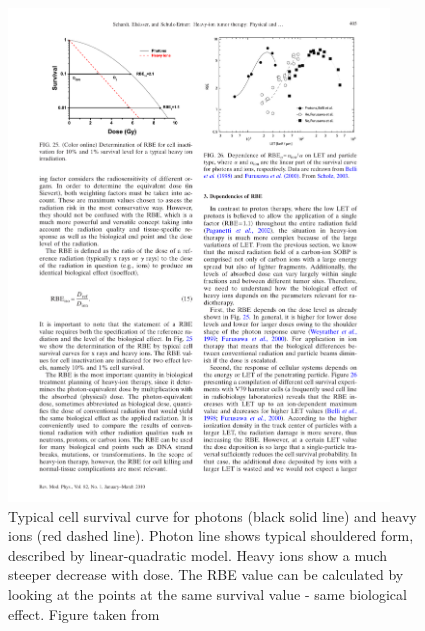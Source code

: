 \documentclass[type=dr, dr=rernat, accentcolor=tud7b,colorbacktitle, bigchapter, openright, twoside, 12pt ]{tudthesis}
\begin{document}
\begin{figure}[H]
\begin{center}
\includegraphics[width=0.9\textwidth]{./Images/dose_dependence.pdf}
\caption{Typical cell survival curve for photons (black solid line) and heavy ions (red dashed line). Photon line shows typical shouldered form, described by linear-quadratic model.
Heavy ions show a much steeper decrease with dose. The RBE value can be calculated by looking at the points at the same survival value - same biological effect. Figure taken from \cite{Schardt2010}}
\label{dosedep}
\end{center}
\end{figure}
\end{document}
